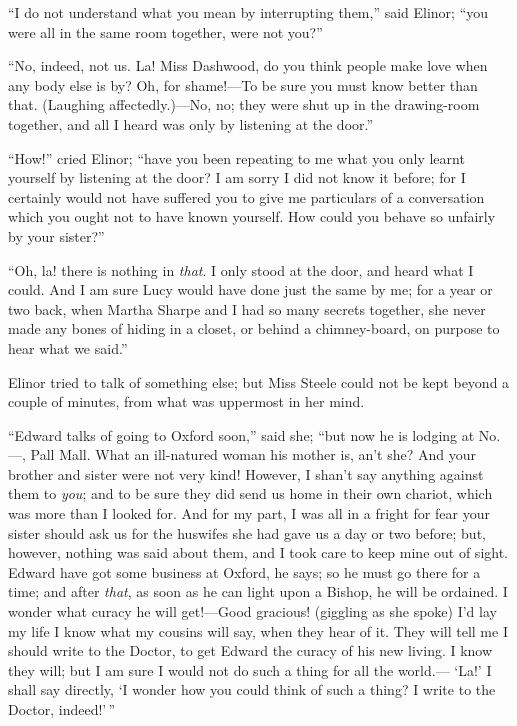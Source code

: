 ``I do not understand what you mean by interrupting them,''
said Elinor; ``you were all in the same room together,
were not you?''

``No, indeed, not us.  La! Miss Dashwood, do you
think people make love when any body else is by?  Oh,
for shame!---To be sure you must know better than that.
(Laughing affectedly.)---No, no; they were shut up in the
drawing-room together, and all I heard was only by listening
at the door.''

``How!'' cried Elinor; ``have you been repeating to me
what you only learnt yourself by listening at the door?
I am sorry I did not know it before; for I certainly
would not have suffered you to give me particulars of a
conversation which you ought not to have known yourself.
How could you behave so unfairly by your sister?''

``Oh, la! there is nothing in \emph{that}.  I only stood at
the door, and heard what I could.  And I am sure Lucy would
have done just the same by me; for a year or two back,
when Martha Sharpe and I had so many secrets together,
she never made any bones of hiding in a closet, or behind
a chimney-board, on purpose to hear what we said.''

Elinor tried to talk of something else; but Miss
Steele could not be kept beyond a couple of minutes,
from what was uppermost in her mind.

``Edward talks of going to Oxford soon,'' said she;
``but now he is lodging at No. ---, Pall Mall.  What an
ill-natured woman his mother is, an't she? And your
brother and sister were not very kind! However,
I shan't say anything against them to \emph{you}; and to be sure
they did send us home in their own chariot, which
was more than I looked for.  And for my part, I was all
in a fright for fear your sister should ask us for the
huswifes she had gave us a day or two before; but, however,
nothing was said about them, and I took care to keep mine
out of sight.  Edward have got some business at Oxford,
he says; so he must go there for a time; and after \emph{that},
as soon as he can light upon a Bishop, he will be ordained.
I wonder what curacy he will get!---Good gracious!
(giggling as she spoke) I'd lay my life I know what
my cousins will say, when they hear of it.  They will
tell me I should write to the Doctor, to get Edward
the curacy of his new living.  I know they will; but I am
sure I would not do such a thing for all the world.---%
`La!' I shall say directly, `I wonder how you could think
of such a thing?  I write to the Doctor, indeed!'\,''

